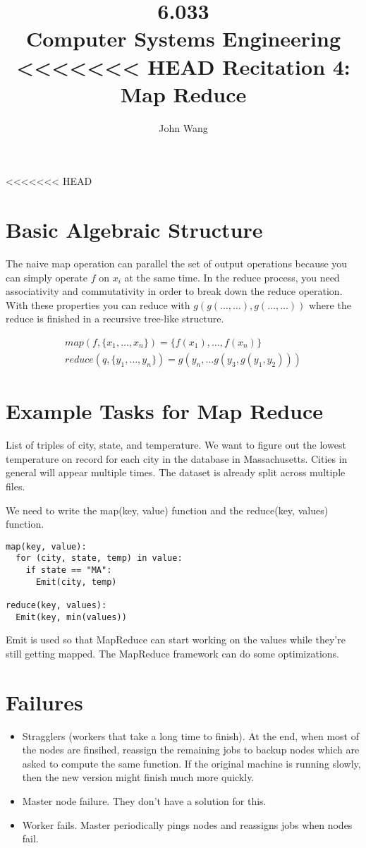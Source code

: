 \documentclass[psamsfonts]{amsart}
\title{6.033 \\
Computer Systems Engineering \\
<<<<<<< HEAD
Recitation 4: Map Reduce}
\author{John Wang}
\begin{document}
<<<<<<< HEAD
\section{Basic Algebraic Structure}

The naive map operation can parallel the set of output operations because you can simply operate $f$ on $x_i$ at the same time. In the reduce process, you need associativity and commutativity in order to break down the reduce operation. With these properties you can reduce with $g(g(\ldots, \ldots), g(\ldots, \ldots))$ where the reduce is finished in a recursive tree-like structure.

\begin{eqnarray}
map(f, \{x_1, \ldots, x_n\}) = \{f(x_1), \ldots, f(x_n) \} \\
reduce(q, \{y_1, \ldots, y_n\}) = g(y_n, \ldots g(y_3, g(y_1, y_2)))
\end{eqnarray}

\section{Example Tasks for Map Reduce}

List of triples of city, state, and temperature. We want to figure out the lowest temperature on record for each city in the database in Massachusetts. Cities in general will appear multiple times. The dataset is already split across multiple files.

We need to write the map(key, value) function and the reduce(key, values) function.

\begin{verbatim}
map(key, value):
  for (city, state, temp) in value:
    if state == "MA":
      Emit(city, temp)

reduce(key, values):
  Emit(key, min(values))
\end{verbatim}

Emit is used so that MapReduce can start working on the values while they're still getting mapped. The MapReduce framework can do some optimizations. 

\section{Failures}

\begin{itemize}
  \item Stragglers (workers that take a long time to finish). At the end, when most of the nodes are finsihed, reassign the remaining jobs to backup nodes which are asked to compute the same function. If the original machine is running slowly, then the new version might finish much more quickly.
  \item Master node failure. They don't have a solution for this.
  \item Worker fails. Master periodically pings nodes and reassigns jobs when nodes fail.
\end{itemize}
\end{document}
